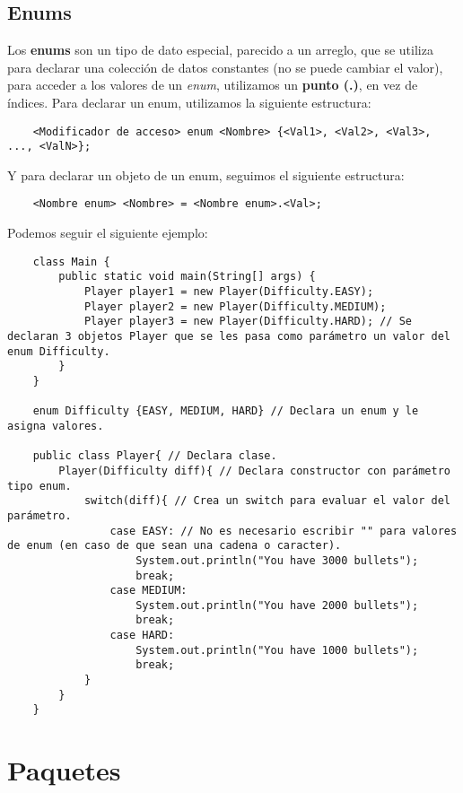 \subsection{Enums}

Los \textbf{enums} son un tipo de dato especial, parecido a un arreglo, que se utiliza para declarar una colección de datos constantes (no se puede cambiar el valor), para acceder a los valores de un \textit{enum}, utilizamos un \textbf{punto (.)}, en vez de índices. Para declarar un enum, utilizamos la siguiente estructura:
\begin{lstlisting}
    <Modificador de acceso> enum <Nombre> {<Val1>, <Val2>, <Val3>, ..., <ValN>};
\end{lstlisting}

Y para declarar un objeto de un enum, seguimos el siguiente estructura:
\begin{lstlisting}
    <Nombre enum> <Nombre> = <Nombre enum>.<Val>;
\end{lstlisting}

Podemos seguir el siguiente ejemplo:
\begin{lstlisting}
    class Main {
        public static void main(String[] args) {
            Player player1 = new Player(Difficulty.EASY);
            Player player2 = new Player(Difficulty.MEDIUM);
            Player player3 = new Player(Difficulty.HARD); // Se declaran 3 objetos Player que se les pasa como parámetro un valor del enum Difficulty.
        }
    }

    enum Difficulty {EASY, MEDIUM, HARD} // Declara un enum y le asigna valores.

    public class Player{ // Declara clase.
        Player(Difficulty diff){ // Declara constructor con parámetro tipo enum.
            switch(diff){ // Crea un switch para evaluar el valor del parámetro.
                case EASY: // No es necesario escribir "" para valores de enum (en caso de que sean una cadena o caracter).
                    System.out.println("You have 3000 bullets");
                    break;
                case MEDIUM:
                    System.out.println("You have 2000 bullets");
                    break;
                case HARD:
                    System.out.println("You have 1000 bullets");
                    break;
            }
        }
    }
\end{lstlisting}



\section{Paquetes}

